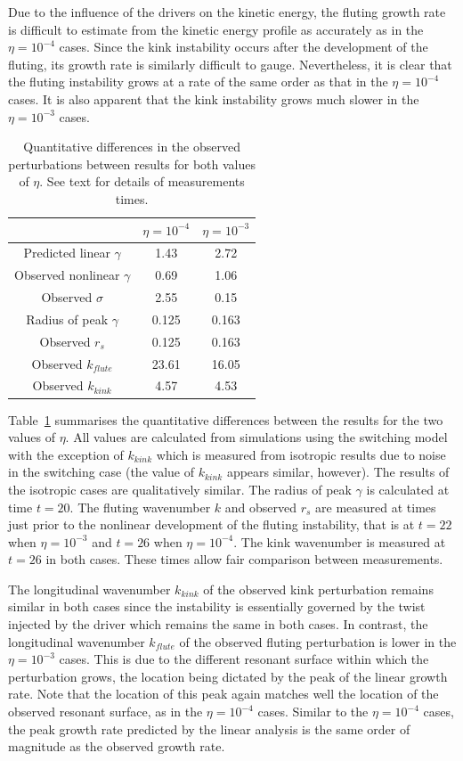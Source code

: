 Due to the influence of the drivers on the kinetic energy, the fluting growth rate is difficult to estimate from the kinetic energy profile as accurately as in the $\eta=10^{-4}$ cases. Since the kink instability occurs after the development of the fluting, its growth rate is similarly difficult to gauge. Nevertheless, it is clear that the fluting instability grows at a rate of the same order as that in the $\eta=10^{-4}$ cases. It is also apparent that the kink instability grows much slower in the $\eta=10^{-3}$ cases.

\begin{table}[]
\centering
\begin{tabular}{ccc}
&
$\eta=10^{-4}$ &
$\eta=10^{-3}$ \\
\midrule
Predicted linear $\gamma$ & 1.43 & 2.72  \\
Observed nonlinear $\gamma$ & 0.69 & 1.06  \\
Observed $\sigma$ & 2.55 & 0.15\\
\midrule
Radius of peak $\gamma$ & 0.125 & 0.163 \\
Observed $r_s$ & 0.125 & 0.163 \\
\midrule
Observed $k_{flute}$ & 23.61 & 16.05 \\
Observed $k_{kink}$ & 4.57 & 4.53 \\
\end{tabular}
\caption{Quantitative differences in the observed perturbations between results for both values of $\eta$. See text for details of measurements times.}
\label{tab:kink_fluting_params}
\end{table}

Table~\ref{tab:kink_fluting_params} summarises the quantitative differences between the results for the two values of $\eta$. All values are calculated from simulations using the switching model with the exception of $k_{kink}$ which is measured from isotropic results due to noise in the switching case (the value of $k_{kink}$ appears similar, however). The results of the isotropic cases are qualitatively similar. The radius of peak $\gamma$ is calculated at time $t=20$. The fluting wavenumber $k$ and observed $r_s$ are measured at times just prior to the nonlinear development of the fluting instability, that is at $t=22$ when $\eta=10^{-3}$ and $t=26$ when $\eta = 10^{-4}$. The kink wavenumber is measured at $t=26$ in both cases. These times allow fair comparison between measurements.

The longitudinal wavenumber $k_{kink}$ of the observed kink perturbation remains similar in both cases since the instability is essentially governed by the twist injected by the driver which remains the same in both cases. In contrast, the longitudinal wavenumber $k_{flute}$ of the observed fluting perturbation is lower in the $\eta=10^{-3}$ cases. This is due to the different resonant surface within which the perturbation grows, the location being dictated by the peak of the linear growth rate. Note that the location of this peak again matches well the location of the observed resonant surface, as in the $\eta=10^{-4}$ cases. Similar to the $\eta=10^{-4}$ cases, the peak growth rate predicted by the linear analysis is the same order of magnitude as the observed growth rate.

